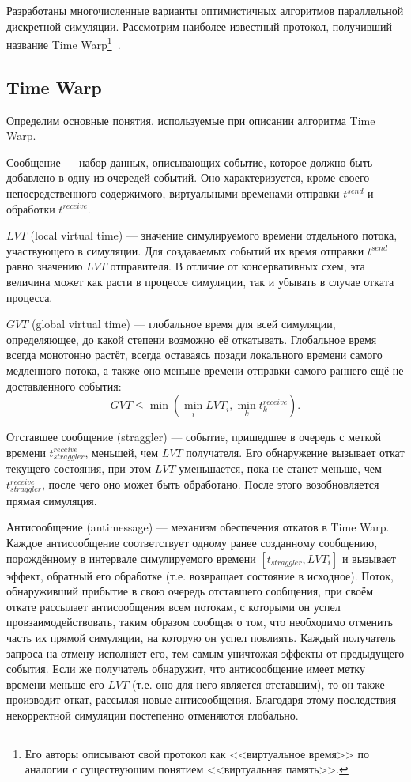 Разработаны многочисленные варианты оптимистичных алгоритмов параллельной дискретной симуляции. Рассмотрим наиболее известный протокол, получивший название Time Warp\footnote{Его авторы описывают свой протокол как <<виртуальное время>> по аналогии с существующим понятием <<виртуальная память>>.}~\cite{virtual-time}.

\subsection{Time Warp}

Определим основные понятия, используемые при описании алгоритма Time Warp.

\begin{itemize*}
    \item Сообщение --- набор данных, описывающих событие, которое должно быть добавлено в одну из очередей событий. Оно характеризуется, кроме своего непосредственного содержимого, виртуальными временами отправки $t^{send}$ и обработки $t^{receive}$.
    \item $LVT$ (\abbr local virtual time) --- значение симулируемого времени отдельного потока, участвующего в симуляции. Для создаваемых событий их время отправки $t^{send}$ равно значению $LVT$ отправителя. В отличие от консервативных схем, эта величина может как расти в процессе симуляции, так и убывать в случае отката процесса.
    \item $GVT$ (\abbr global virtual time) --- глобальное время для всей симуляции, определяющее, до какой степени возможно её откатывать.  Глобальное время всегда монотонно растёт, всегда оставаясь позади локального времени самого медленного потока, а также оно меньше времени отправки самого раннего ещё не доставленного события:
    $$GVT \leq \min \left( \min\limits_{i} LVT_{i}, \min\limits_{k} t^{receive}_k  \right).$$
    \item Отставшее сообщение (\abbr straggler) --- событие, пришедшее в очередь с меткой времени $t^{receive}_{straggler}$, меньшей, чем $LVT$ получателя. Его обнаружение вызывает откат текущего состояния, при этом $LVT$ уменьшается, пока не станет меньше, чем $t^{receive}_{straggler}$, после чего оно может быть обработано. После этого возобновляется прямая симуляция.
    \item Антисообщение (\abbr antimessage) --- механизм обеспечения откатов в Time Warp. Каждое антисообщение соответствует одному ранее созданному сообщению, порождённому в интервале симулируемого времени $[t_{straggler}, LVT_i]$ и  вызывает эффект, обратный его обработке (т.е. возвращает состояние в исходное). Поток, обнаруживший прибытие в свою очередь отставшего сообщения, при своём откате рассылает антисообщения всем потокам, с которыми он успел провзаимодействовать, таким образом сообщая о том, что необходимо отменить часть их прямой симуляции, на которую он успел повлиять. Каждый получатель запроса на отмену исполняет его, тем самым уничтожая эффекты от предыдущего события. Если же получатель обнаружит, что антисообщение имеет метку времени меньше его $LVT$ (т.е. оно для него является отставшим), то он также производит откат, рассылая новые антисообщения. Благодаря этому последствия некорректной симуляции постепенно отменяются глобально.
    

\end{itemize*}
